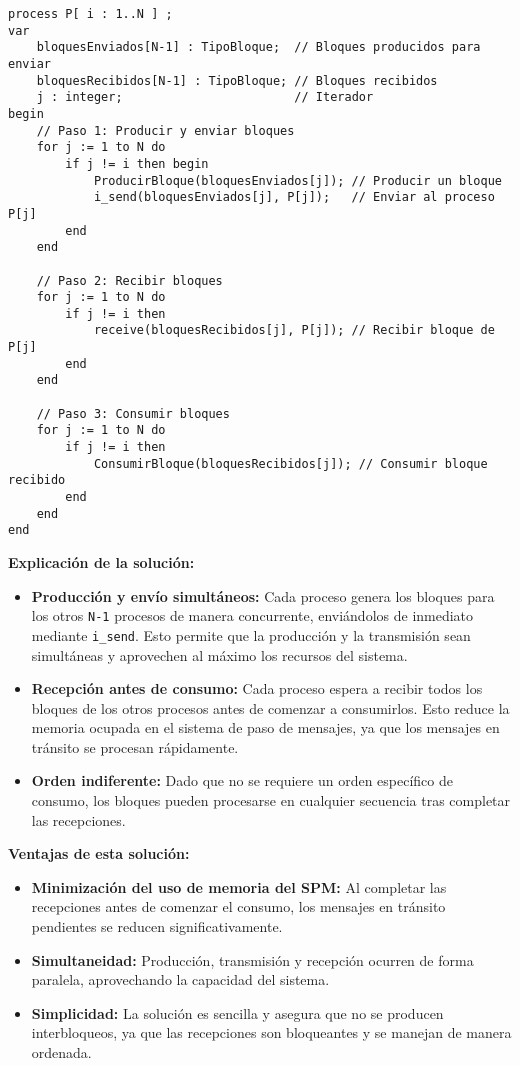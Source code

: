 \documentclass[a4paper,12pt]{article}
\begin{document}
\begin{lstlisting}[style=customcpp]
process P[ i : 1..N ] ;
var
    bloquesEnviados[N-1] : TipoBloque;  // Bloques producidos para enviar
    bloquesRecibidos[N-1] : TipoBloque; // Bloques recibidos
    j : integer;                        // Iterador
begin
    // Paso 1: Producir y enviar bloques
    for j := 1 to N do
        if j != i then begin
            ProducirBloque(bloquesEnviados[j]); // Producir un bloque
            i_send(bloquesEnviados[j], P[j]);   // Enviar al proceso P[j]
        end
    end

    // Paso 2: Recibir bloques
    for j := 1 to N do
        if j != i then
            receive(bloquesRecibidos[j], P[j]); // Recibir bloque de P[j]
        end
    end

    // Paso 3: Consumir bloques
    for j := 1 to N do
        if j != i then
            ConsumirBloque(bloquesRecibidos[j]); // Consumir bloque recibido
        end
    end
end
\end{lstlisting}

\textbf{Explicación de la solución:}

\begin{itemize}
    \item \textbf{Producción y envío simultáneos:} Cada proceso genera los bloques para los otros \texttt{N-1} procesos de manera concurrente, enviándolos de inmediato mediante \texttt{i\_send}. Esto permite que la producción y la transmisión sean simultáneas y aprovechen al máximo los recursos del sistema.
    \item \textbf{Recepción antes de consumo:} Cada proceso espera a recibir todos los bloques de los otros procesos antes de comenzar a consumirlos. Esto reduce la memoria ocupada en el sistema de paso de mensajes, ya que los mensajes en tránsito se procesan rápidamente.
    \item \textbf{Orden indiferente:} Dado que no se requiere un orden específico de consumo, los bloques pueden procesarse en cualquier secuencia tras completar las recepciones.
\end{itemize}

\textbf{Ventajas de esta solución:}
\begin{itemize}
    \item \textbf{Minimización del uso de memoria del SPM:} Al completar las recepciones antes de comenzar el consumo, los mensajes en tránsito pendientes se reducen significativamente.
    \item \textbf{Simultaneidad:} Producción, transmisión y recepción ocurren de forma paralela, aprovechando la capacidad del sistema.
    \item \textbf{Simplicidad:} La solución es sencilla y asegura que no se producen interbloqueos, ya que las recepciones son bloqueantes y se manejan de manera ordenada.
\end{itemize}
\end{document}
